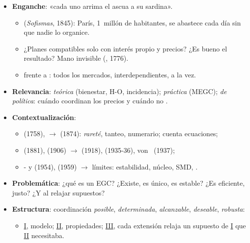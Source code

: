 \documentclass{article}
\begin{document}
\cabecerarepaso
\begin{columnas}

\begin{itemize}
\item \textbf{Enganche}: «cada uno arrima el ascua a su sardina».
  \begin{itemize}
  \item {} (\emph{Sofismas}, 1845): París, 1~millón de habitantes, se abastece cada día sin que nadie lo organice.
  \item ¿Planes compatibles solo con interés propio y precios? ¿Es bueno el resultado? Mano invisible (, 1776).
  \item {}  frente a : todos los mercados, interdependientes, a la vez.
  \end{itemize}
\item \textbf{Relevancia}: \emph{teórica} (bienestar, H-O, incidencia); \emph{práctica} (MEGC); \emph{de política}: cuándo coordinan los precios y cuándo no .
\item \textbf{Contextualización}:
  \begin{itemize}
  \item {} (1758),  $\to$  (1874): \emph{rareté}, tanteo, numerario; cuenta ecuaciones;
  \item {} (1881),  (1906) $\to$  (1918),  (1935-36), von~ (1937);
  \item {}- y  (1954),  (1959) $\to$ límites: estabilidad, núcleo, SMD, .
  \end{itemize}
\item \textbf{Problemática}: ¿qué es un EGC? ¿Existe, es único, es estable? ¿Es eficiente, justo? ¿Y al relajar supuestos?
\item \textbf{Estructura}: coordinación \emph{posible}, \emph{determinada}, \emph{alcanzable}, \emph{deseable}, \emph{robusta}:
  \begin{itemize}
  \item \hyperref[rep:I]{I}, modelo; \hyperref[rep:II]{II}, propiedades; \hyperref[rep:III]{III}, cada extensión relaja un supuesto de \hyperref[rep:I]{I} que \hyperref[rep:II]{II} necesitaba.
  \end{itemize}

\end{itemize}
\end{columnas}
\end{document}
